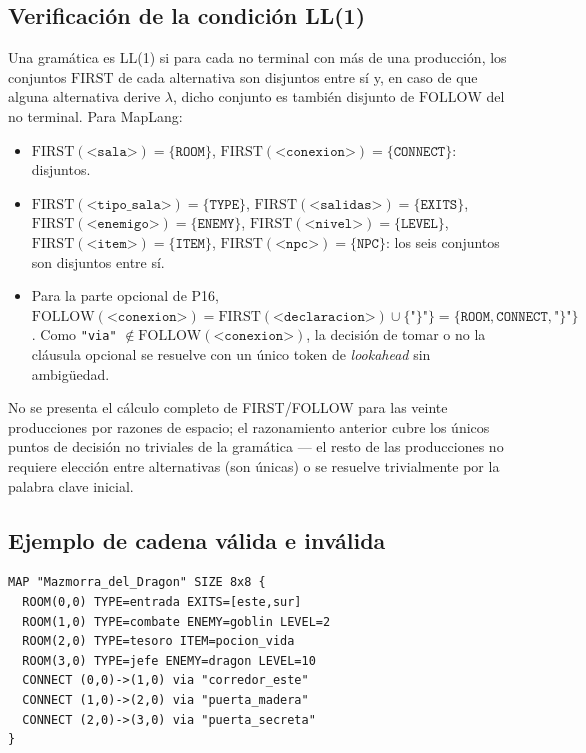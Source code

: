 \documentclass[10pt,twocolumn]{article}
\begin{document}
\subsection{Verificación de la condición LL(1)}

Una gramática es LL(1) si para cada no terminal con más de una producción,
los conjuntos $\mathrm{FIRST}$ de cada alternativa son disjuntos entre sí
y, en caso de que alguna alternativa derive $\lambda$, dicho conjunto es
también disjunto de $\mathrm{FOLLOW}$ del no terminal. Para MapLang:

\begin{itemize}[leftmargin=*,itemsep=1pt]
\item $\mathrm{FIRST}(\texttt{<sala>}) = \{\texttt{ROOM}\}$,
$\mathrm{FIRST}(\texttt{<conexion>}) = \{\texttt{CONNECT}\}$: disjuntos.
\item $\mathrm{FIRST}(\texttt{<tipo\_sala>}) = \{\texttt{TYPE}\}$,
$\mathrm{FIRST}(\texttt{<salidas>}) = \{\texttt{EXITS}\}$,
$\mathrm{FIRST}(\texttt{<enemigo>}) = \{\texttt{ENEMY}\}$,
$\mathrm{FIRST}(\texttt{<nivel>}) = \{\texttt{LEVEL}\}$,
$\mathrm{FIRST}(\texttt{<item>}) = \{\texttt{ITEM}\}$,
$\mathrm{FIRST}(\texttt{<npc>}) = \{\texttt{NPC}\}$: los seis conjuntos son
disjuntos entre sí.
\item Para la parte opcional de P16, $\mathrm{FOLLOW}(\texttt{<conexion>})
= \mathrm{FIRST}(\texttt{<declaracion>}) \cup \{\texttt{"\}"}\} =
\{\texttt{ROOM}, \texttt{CONNECT}, \texttt{"\}"}\}$. Como
\texttt{"via"} $\notin \mathrm{FOLLOW}(\texttt{<conexion>})$, la decisión
de tomar o no la cláusula opcional se resuelve con un único token de
\textit{lookahead} sin ambigüedad.
\end{itemize}

No se presenta el cálculo completo de FIRST/FOLLOW para las veinte
producciones por razones de espacio; el razonamiento anterior cubre los
únicos puntos de decisión no triviales de la gramática --- el resto de las
producciones no requiere elección entre alternativas (son únicas) o se
resuelve trivialmente por la palabra clave inicial.

\subsection{Ejemplo de cadena válida e inválida}

\begin{lstlisting}[language=maplang,caption={Cadena válida: la «Mazmorra del Dragón».}]
MAP "Mazmorra_del_Dragon" SIZE 8x8 {
  ROOM(0,0) TYPE=entrada EXITS=[este,sur]
  ROOM(1,0) TYPE=combate ENEMY=goblin LEVEL=2
  ROOM(2,0) TYPE=tesoro ITEM=pocion_vida
  ROOM(3,0) TYPE=jefe ENEMY=dragon LEVEL=10
  CONNECT (0,0)->(1,0) via "corredor_este"
  CONNECT (1,0)->(2,0) via "puerta_madera"
  CONNECT (2,0)->(3,0) via "puerta_secreta"
}
\end{lstlisting}
\end{document}
